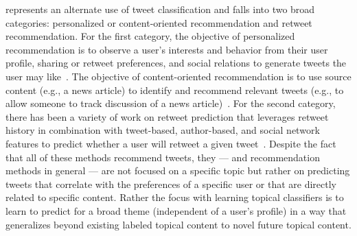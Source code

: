%

%

% 

\vspace{2mm}
 represents an alternate use of
tweet classification and falls into two broad categories: personalized or
content-oriented recommendation and retweet recommendation.  For the
first category, the objective of personalized recommendation is to
observe a user's interests and behavior from their user profile,
sharing or retweet preferences, and social relations to generate
tweets the user may like~\cite{Yan,chen}.  The objective of
content-oriented recommendation is to use source content (e.g., a news
article) to identify and recommend relevant tweets (e.g., to allow
someone to track discussion of a news article)~\cite{Krestel}.  For
the second category, there has been a variety of work on retweet
prediction that leverages retweet history in combination with
tweet-based, author-based, and social network features to predict
whether a user will retweet a given
tweet~\cite{can,xu,petrovicOsborne}.  Despite the fact that all of
these methods recommend tweets, they --- and recommendation methods in
general --- are not focused on a specific topic but rather on
predicting tweets that correlate with the preferences of a specific
user or that are directly related to specific content.  Rather the
focus with learning topical classifiers is to learn to predict for
a broad theme (independent of a user's profile) in a way that
generalizes beyond existing labeled topical content to novel future
topical content.

